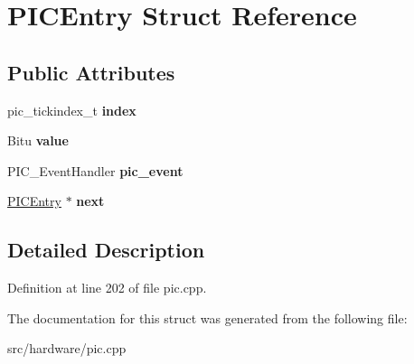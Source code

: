 \hypertarget{structPICEntry}{\section{P\-I\-C\-Entry Struct Reference}
\label{structPICEntry}
}
\subsection*{Public Attributes}
\begin{DoxyCompactItemize}
\item 
\hypertarget{structPICEntry_a6253dbeb4602fe1c76213bc9dcfc6f82}{pic\-\_\-tickindex\-\_\-t {\bfseries index}}\label{structPICEntry_a6253dbeb4602fe1c76213bc9dcfc6f82}

\item 
\hypertarget{structPICEntry_aa24da36d5183c48d36d262f9861b1371}{Bitu {\bfseries value}}\label{structPICEntry_aa24da36d5183c48d36d262f9861b1371}

\item 
\hypertarget{structPICEntry_a1d7e2902f11b356f977faaf6e8f9a5c3}{P\-I\-C\-\_\-\-Event\-Handler {\bfseries pic\-\_\-event}}\label{structPICEntry_a1d7e2902f11b356f977faaf6e8f9a5c3}

\item 
\hypertarget{structPICEntry_a45ff9b7aee4f5401e5d79b0595d818e4}{\hyperlink{structPICEntry}{P\-I\-C\-Entry} $\ast$ {\bfseries next}}\label{structPICEntry_a45ff9b7aee4f5401e5d79b0595d818e4}

\end{DoxyCompactItemize}


\subsection{Detailed Description}


Definition at line 202 of file pic.\-cpp.



The documentation for this struct was generated from the following file\-:\begin{DoxyCompactItemize}
\item 
src/hardware/pic.\-cpp\end{DoxyCompactItemize}
